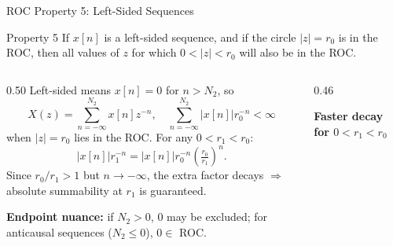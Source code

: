 \begin{frame}[t]{ROC Property 5: Left-Sided Sequences}
  \small
  \begin{conceptbox}{Property 5}
    If $x[n]$ is a left-sided sequence, and if the circle $|z|=r_0$ is in the ROC,
    then all values of $z$ for which $0<|z|<r_0$ will also be in the ROC.
  \end{conceptbox}

  \vspace{0.4cm}
  \begin{columns}[T]
    \begin{column}{0.50\textwidth}
      \footnotesize
      Left-sided means $x[n]=0$ for $n>N_2$, so
      \[
        X(z)=\sum_{n=-\infty}^{N_2}x[n]z^{-n},
        \quad
        \sum_{n=-\infty}^{N_2}|x[n]|r_0^{-n}<\infty
      \]
      when $|z|=r_0$ lies in the ROC. For any $0<r_1<r_0$:
      \[
        |x[n]|r_1^{-n}
        = |x[n]|r_0^{-n}\!\left(\tfrac{r_0}{r_1}\right)^{\!n}.
      \]
      Since $r_0/r_1>1$ but $n\to -\infty$, the extra factor decays $\Rightarrow$ absolute summability at $r_1$ is guaranteed.

      \vspace{0.15cm}
      \textbf{Endpoint nuance:}
      if $N_2>0$, $0$ may be excluded; for anticausal sequences ($N_2\le 0$), $0\in$ ROC.
    \end{column}
    \begin{column}{0.46\textwidth}
      \begin{center}
        \textbf{Faster decay for $0<r_1<r_0$}\\[0.15cm]
\end{center}
\end{column}
\end{columns}
\end{frame}

